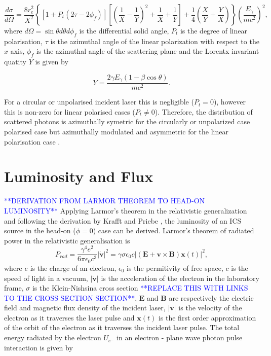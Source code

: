 \documentclass[../main.tex]{subfiles}
\begin{document}
\begin{equation}
\frac{d\sigma}{d\Omega} = \frac{8r_{e}^{2}}{X^{2}}\left\{\left[1+P_{t}\left(2\tau-2\phi_{f}\right)\right]\left[\left(\frac{1}{X}-\frac{1}{Y}\right)^{2}+\frac{1}{X}+\frac{1}{Y}\right]+\frac{1}{4}\left(\frac{X}{Y}+\frac{Y}{X}\right)\right\}\left(\frac{E_{\gamma}}{mc^{2}}\right)^{2},    
\end{equation}
where $d\Omega = \sin\theta d\theta d\phi_{f}$ is the differential solid angle, $P_{t}$ is the degree of linear polarisation, $\tau$ is the azimuthal angle of the linear polarization with respect to the $x$ axis, $\phi_{f}$ is the azimuthal angle of the scattering plane and the Lorentx invariant quatity $Y$ is given by

\begin{equation}
Y = \frac{2\gamma E_{\gamma}\left(1-\beta\cos\theta\right)}{mc^{2}}.
\label{eq:cross_section_Y}    
\end{equation}

For a circular or unpolarised incident laser this is negligible ($P_{t}=0$), however this is non-zero for linear polarised cases ($P_{t}\neq0$). Therefore, the distribution of scattered photons is azimuthally symetric for the circularly or unpolarized case polarised case but azimuthally modulated and asymmetric for the linear polarisation case \cite{sun2011theoretical}.  

\section{Luminosity and Flux}
\label{sec:luminosity_and_flux}
\textcolor{blue}{**DERIVATION FROM LARMOR THEOREM TO HEAD-ON LUMINOSITY**}
Applying Larmor's theorem \cite{larmor1897lxiii,purcell1965electricity} in the relativistic generalization \cite{jackson1999classical} and following the derivation by Krafft and Priebe \cite{krafft2010compton}, the luminosity of an ICS source in the head-on ($\phi=0$) case can be derived. Larmor's theorem of radiated power in the relativistic generalisation is 
\begin{equation}
P_{rad} = \frac{\gamma^{4}e^{2}}{6\pi \epsilon_{0}c^{3}}\lvert\mathbf{\dot{v}}\rvert^{2} = \gamma\sigma\epsilon_{0}c\lvert\left(\mathbf{E}+\mathbf{v}\times\mathbf{B}\right)\mathbf{x}\left(t\right)\rvert^{2},
\label{eq:larmor_formula}    
\end{equation}
where $e$ is the charge of an electron,  $\epsilon_{0}$ is the permitivity of free space, $c$ is the speed of light in a vacuum, $\lvert\mathbf{\dot{v}}\rvert$ is the acceleration of the electron in the laboratory frame, $\sigma$ is the Klein-Nishsina cross section \textcolor{blue}{**REPLACE THIS WITH LINKS TO THE CROSS SECTION SECTION**}, $\mathbf{E}$ and $\mathbf{B}$ are respectively the electric field and magnetic flux density of the incident laser, $\lvert\mathbf{v}\rvert$ is the velocity of the electron as it traverses the laser pulse and $\mathbf{x}\left(t\right)$ is the first order approximation of the orbit of the electron as it traverses the incident laser pulse. 
The total energy radiated by the electron $U_{e^{-}}$ in an electron - plane wave photon pulse interaction is given by \cite{krafft2010compton}
\end{document}
